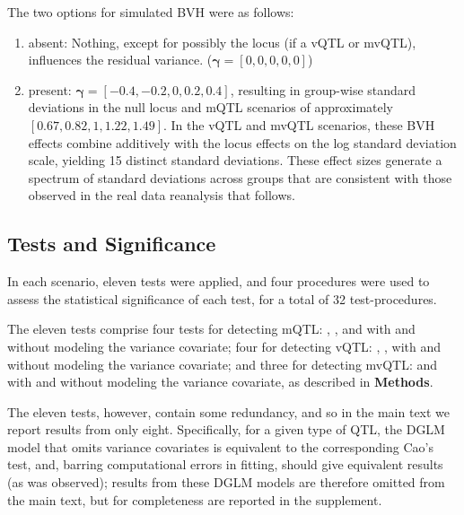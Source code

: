 The two options for simulated BVH were as follows:
\begin{enumerate}
    \item absent: Nothing, except for possibly the locus (if a vQTL or mvQTL), influences the residual variance.  ($\bm{\gamma} = [0, 0, 0, 0, 0]$)
    \item present: $\bm{\gamma} = [-0.4, -0.2, 0, 0.2, 0.4]$, resulting in group-wise standard deviations in the null locus and mQTL scenarios of approximately $[0.67, 0.82, 1, 1.22, 1.49]$.
    In the vQTL and mvQTL scenarios, these BVH effects combine additively with the locus effects on the log standard deviation scale, yielding 15 distinct standard deviations.
    These effect sizes generate a spectrum of standard deviations across groups that are consistent with those observed in the real data reanalysis that follows.
\end{enumerate}


\subsection{Tests and Significance}
In each scenario, eleven tests were applied, and four procedures were used to assess the statistical significance of each test, for a total of 32 test-procedures.

The eleven tests comprise four tests for detecting mQTL: \LM, \Caom, and \DGLMm  with and without modeling the variance covariate; four for detecting vQTL: \Lev, \Caov, \DGLMv with and without modeling the variance covariate; and three for detecting mvQTL: \Caomv and \DGLMmv with and without modeling the variance covariate, as described in \textbf{Methods}.

The eleven tests, however, contain some redundancy, and so in the main text we report results from only eight. Specifically, for a given type of QTL, the DGLM model that omits variance covariates is equivalent to the corresponding Cao's test, and, barring computational errors in fitting, should give equivalent results (as was observed); results from these DGLM models are therefore omitted from the main text, but for completeness are reported in the supplement.


